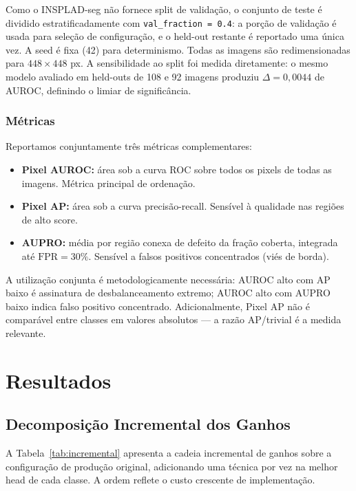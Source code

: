 \documentclass[conference]{IEEEtran}
\begin{document}
Como o INSPLAD-seg não fornece split de validação, o conjunto de teste é dividido estratificadamente com \texttt{val\_fraction\,=\,0.4}: a porção de validação é usada para seleção de configuração, e o held-out restante é reportado uma única vez. A seed é fixa (42) para determinismo. Todas as imagens são redimensionadas para $448 \times 448$ px. A sensibilidade ao split foi medida diretamente: o mesmo modelo avaliado em held-outs de 108 e 92 imagens produziu $\Delta = 0{,}0044$ de AUROC, definindo o limiar de significância.

\subsubsection{Métricas}

Reportamos conjuntamente três métricas complementares:
\begin{itemize}
    \item \textbf{Pixel AUROC:} área sob a curva ROC sobre todos os pixels de todas as imagens. Métrica principal de ordenação.
    \item \textbf{Pixel AP:} área sob a curva precisão-recall. Sensível à qualidade nas regiões de alto score.
    \item \textbf{AUPRO:} média por região conexa de defeito da fração coberta, integrada até $\text{FPR} = 30\%$. Sensível a falsos positivos concentrados (viés de borda).
\end{itemize}

A utilização conjunta é metodologicamente necessária: AUROC alto com AP baixo é assinatura de desbalanceamento extremo; AUROC alto com AUPRO baixo indica falso positivo concentrado. Adicionalmente, Pixel AP não é comparável entre classes em valores absolutos --- a razão AP/trivial é a medida relevante.


\section{Resultados}
\label{sec:results}

\subsection{Decomposição Incremental dos Ganhos}
\label{sec:incremental}

A Tabela~\ref{tab:incremental} apresenta a cadeia incremental de ganhos sobre a configuração de produção original, adicionando uma técnica por vez na melhor head de cada classe. A ordem reflete o custo crescente de implementação.
\end{document}

